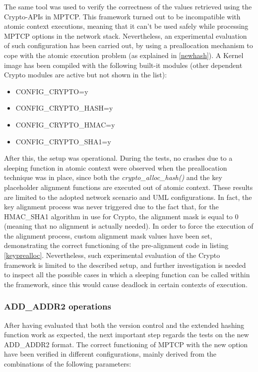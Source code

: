 The same tool was used to verify the correctness of the values retrieved using the Crypto-APIs in MPTCP. This framework turned out to be incompatible with atomic context executions, meaning that it can't be used safely while processing MPTCP options in the network stack. Nevertheless, an experimental evaluation of such configuration has been carried out, by using a preallocation mechanism to cope with the atomic execution problem (as explained in \ref{newhash}). 
A Kernel image has been compiled with the following built-it modules (other dependent Crypto modules are active but not shown in the list):
\begin{itemize}
  \item CONFIG\_CRYPTO=y
  \item CONFIG\_CRYPTO\_HASH=y
  \item CONFIG\_CRYPTO\_HMAC=y
  \item CONFIG\_CRYPTO\_SHA1=y
\end{itemize}
After this, the setup was operational. During the tests, no crashes due to a sleeping function in atomic context were observed when the preallocation technique was in place, since both the \textit{crypto\_alloc\_hash()} and the key placeholder alignment functions are executed out of atomic context. These results are limited to the adopted network scenario and UML configurations. In fact, the key alignment process was never triggered due to the fact that, for the HMAC\_SHA1 algorithm in use for Crypto, the alignment mask is equal to 0 (meaning that no alignment is actually needed). In order to force the execution of the alignment process, custom alignment mask values have been set, demonstrating the correct functioning of the pre-alignment code in listing \ref{keyprealloc}. Nevertheless, such experimental evaluation of the Crypto framework is limited to the described setup, and further investigation is needed to inspect all the possible cases in which a sleeping function can be called within the framework, since this would cause deadlock in certain contexts of execution.

\subsubsection{ADD\_ADDR2 operations}
After having evaluated that both the version control and the extended hashing function work as expected, the next important step regards the tests on the new ADD\_ADDR2 format. The correct functioning of MPTCP with the new option have been verified in different configurations, mainly derived from the combinations of the following parameters:

